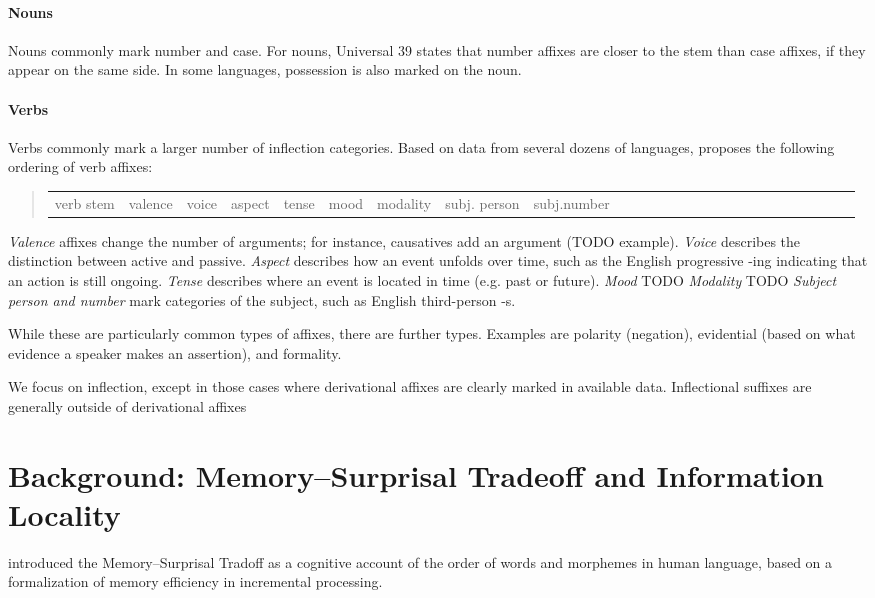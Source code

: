 \documentclass[11pt,letterpaper]{article}
\begin{document}
\paragraph{Nouns}
Nouns commonly mark number and case.
For nouns, \citep[112]{greenberg1963universals} Universal 39 states that number affixes are closer to the stem than case affixes, if they appear on the same side.
In some languages, possession is also marked on the noun.

\paragraph{Verbs}
Verbs commonly mark a larger number of inflection categories.
Based on data from several dozens of languages, \citep{bybee-morphology-1985} proposes the following ordering of verb affixes:
\begin{quote}
\begin{tabular}{llllllllllllllllllllllllll}
verb stem & valence & voice & aspect & tense& mood & modality & subj. person & subj.number
\end{tabular}
\end{quote}
\textit{Valence} affixes change the number of arguments; for instance, causatives add an argument (TODO example).
\textit{Voice} describes the distinction between active and passive.
\textit{Aspect} describes how an event unfolds over time, such as the English progressive -ing indicating that an action  is still ongoing.
\textit{Tense} describes where an event is located in time (e.g. past or future).
\textit{Mood} TODO \textit{Modality} TODO
\textit{Subject person and number} mark categories of the subject, such as English third-person -s.

While these are particularly common types of affixes, there are further types.
Examples are polarity (negation), evidential (based on what evidence a speaker makes an assertion), and formality.


We focus on inflection, except in those cases where derivational affixes are clearly marked in available data.
Inflectional suffixes are generally outside of derivational affixes


\section{Background: Memory--Surprisal Tradeoff and Information Locality}

\citet{Hahn2020modeling} introduced the Memory--Surprisal Tradoff as a cognitive account of the order of words and morphemes in human language, based on a formalization of memory efficiency in incremental processing.
\end{document}
